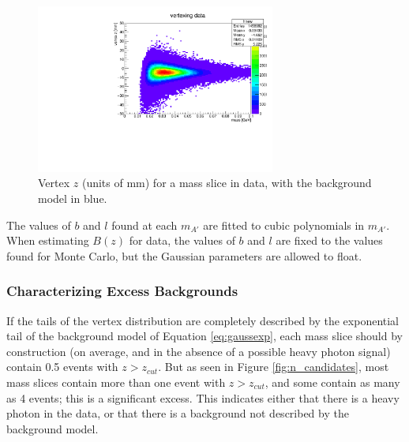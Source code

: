 \begin{figure}[ht]
\begin{center}
    \includegraphics[width=0.7\textwidth,page=61,angle=-90]{vertexing/figs/golden_mres}
\end{center}
\caption{Vertex $z$ (units of mm) for a mass slice in data, with the background model in blue.}
    \label{fig:vz_fit}
\end{figure}

The values of $b$ and $l$ found at each $m_{A'}$ are fitted to cubic polynomials in $m_{A'}$.
When estimating $B(z)$ for data, the values of $b$ and $l$ are fixed to the values found for Monte Carlo, but the Gaussian parameters are allowed to float.

\subsubsection{Characterizing Excess Backgrounds}
\label{sec:excess_background}
If the tails of the vertex distribution are completely described by the exponential tail of the background model of Equation \ref{eq:gaussexp}, each mass slice should by construction (on average, and in the absence of a possible heavy photon signal) contain 0.5 events with $z>z_{cut}$.
But as seen in Figure \ref{fig:n_candidates}, most mass slices contain more than one event with $z>z_{cut}$, and some contain as many as 4 events; this is a significant excess.
This indicates either that there is a heavy photon in the data, or that there is a background not described by the background model.

